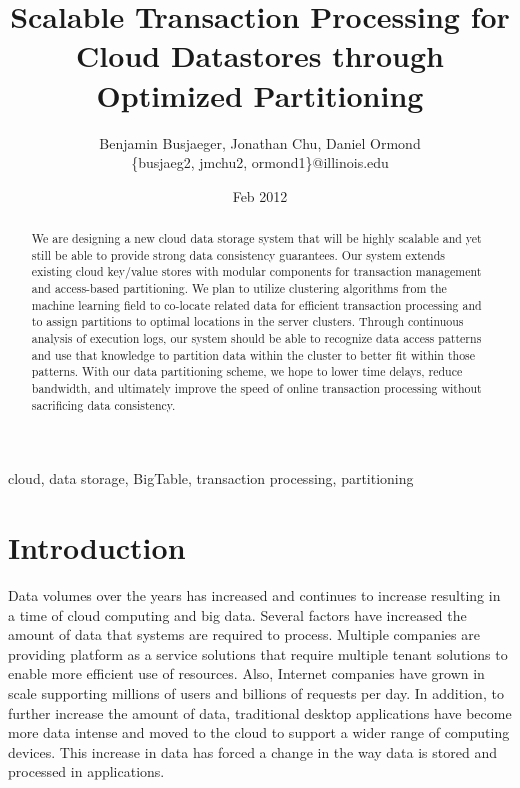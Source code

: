 \documentclass[10pt,final,journal]{IEEEtran}
\begin{document}
\title{Scalable Transaction Processing for Cloud Datastores through Optimized Partitioning}
\author{Benjamin Busjaeger, Jonathan Chu, Daniel Ormond \\
\{busjaeg2, jmchu2, ormond1\}@illinois.edu}
\date{Feb 2012}
\maketitle

\begin{abstract}
We are designing a new cloud data storage system that will be highly scalable and yet still be able to provide strong data consistency guarantees. Our system extends existing cloud key/value stores with modular components for transaction management and access-based partitioning. We plan to utilize clustering algorithms from the machine learning field to co-locate related data for efficient transaction processing and to assign partitions to optimal locations in the server clusters. Through continuous analysis of execution logs, our system should be able to recognize data access patterns and use that knowledge to partition data within the cluster to better fit within those patterns. With our data partitioning scheme, we hope to lower time delays, reduce bandwidth, and ultimately improve the speed of online transaction processing without sacrificing data consistency.
\end{abstract}

\begin{IEEEkeywords}
cloud, data storage, BigTable, transaction processing, partitioning
\end{IEEEkeywords}

\section{Introduction}
Data volumes over the years has increased and continues to increase resulting in a time of cloud computing and big data. Several factors have increased the amount of data that systems are required to process. Multiple companies are providing platform as a service solutions that require multiple tenant solutions to enable more efficient use of resources. Also, Internet companies have grown in scale supporting millions of users and billions of requests per day. In addition, to further increase the amount of data, traditional desktop applications have become more data intense and moved to the cloud to support a wider range of computing devices. This increase in data has forced a change in the way data is stored and processed in applications.
\end{document}
